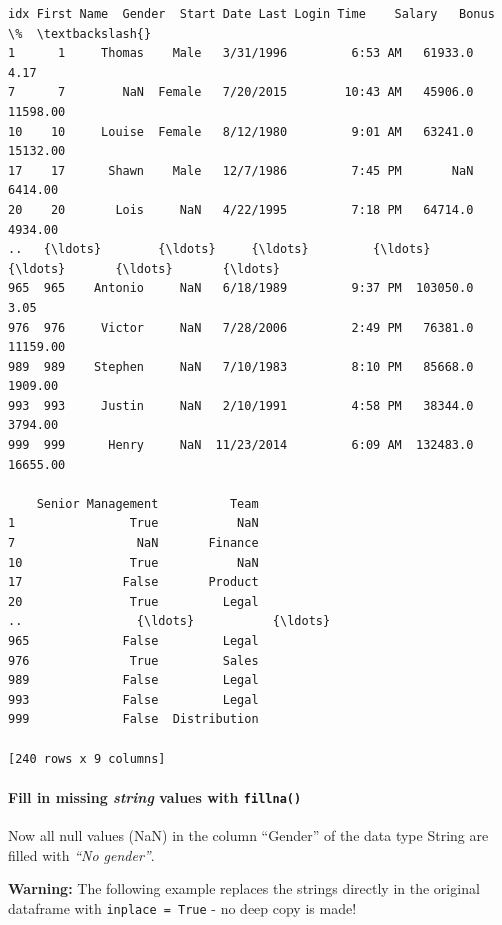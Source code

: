 \documentclass [oneside,10pt,a4paper,ngerman,BCOR10mm,headsepline,parindent,final]{scrartcl}
\makeatletter
\newcommand{\boxspacing}{\kern\kvtcb@left@rule\kern\kvtcb@boxsep}
\newcommand{\prompt}[4]{
        {\ttfamily\llap{{\color{#2}[#3]:\hspace{3pt}#4}}\vspace{-\baselineskip}}
    }
\makeatother
\begin{document}
            \begin{tcolorbox}[breakable, size=fbox, boxrule=.5pt, pad at break*=1mm, opacityfill=0]
\prompt{Out}{outcolor}{6}{\boxspacing}
\begin{Verbatim}[commandchars=\\\{\}]
     idx First Name  Gender  Start Date Last Login Time    Salary   Bonus \%  \textbackslash{}
1      1     Thomas    Male   3/31/1996         6:53 AM   61933.0      4.17
7      7        NaN  Female   7/20/2015        10:43 AM   45906.0  11598.00
10    10     Louise  Female   8/12/1980         9:01 AM   63241.0  15132.00
17    17      Shawn    Male   12/7/1986         7:45 PM       NaN   6414.00
20    20       Lois     NaN   4/22/1995         7:18 PM   64714.0   4934.00
..   {\ldots}        {\ldots}     {\ldots}         {\ldots}             {\ldots}       {\ldots}       {\ldots}
965  965    Antonio     NaN   6/18/1989         9:37 PM  103050.0      3.05
976  976     Victor     NaN   7/28/2006         2:49 PM   76381.0  11159.00
989  989    Stephen     NaN   7/10/1983         8:10 PM   85668.0   1909.00
993  993     Justin     NaN   2/10/1991         4:58 PM   38344.0   3794.00
999  999      Henry     NaN  11/23/2014         6:09 AM  132483.0  16655.00

    Senior Management          Team
1                True           NaN
7                 NaN       Finance
10               True           NaN
17              False       Product
20               True         Legal
..                {\ldots}           {\ldots}
965             False         Legal
976              True         Sales
989             False         Legal
993             False         Legal
999             False  Distribution

[240 rows x 9 columns]
\end{Verbatim}
\end{tcolorbox}
        
    \hypertarget{fill-in-missing-string-values-with-fillna}{%
\paragraph{\texorpdfstring{Fill in missing \emph{string} values with
\texttt{fillna()}}{Fill in missing string values with fillna()}}\label{fill-in-missing-string-values-with-fillna}}

Now all null values (NaN) in the column ``Gender'' of the data type
String are filled with \emph{``No gender''}.

\textbf{Warning:} The following example replaces the strings directly in
the original dataframe with \texttt{inplace\ =\ True} - no deep copy is
made!
\end{document}

